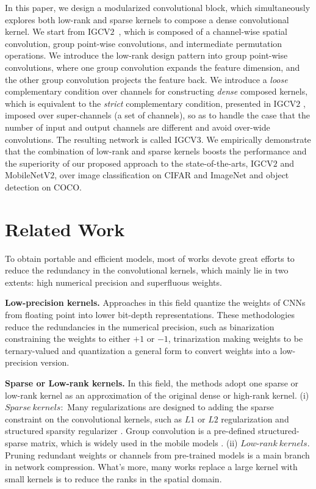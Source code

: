 \documentclass{bmvc2k}
\begin{document}
	In this paper,
	we design a modularized convolutional block,
	which simultaneously explores both low-rank and sparse kernels
	to compose a dense convolutional kernel.
	We start from IGCV$2$~\cite{ISSC18},
	which is composed of a channel-wise spatial convolution,
	group point-wise convolutions,
	and intermediate permutation operations.
	We introduce the low-rank design pattern
	into group point-wise convolutions,
	where one group convolution expands the feature dimension,
	and the other group convolution projects the feature back.
	We introduce a \emph{loose} complementary condition over channels for constructing \emph{dense} composed kernels,
	which is equivalent to the \emph{strict} complementary condition, presented in IGCV$2$ \cite{ISSC18},
	imposed over super-channels (a set of channels),
	so as to handle the case
	that the number of input and output channels are different
	and avoid over-wide convolutions.
	The resulting network is called IGCV$3$.
	We empirically demonstrate that the combination of low-rank and sparse kernels boosts the performance
	and the superiority of our proposed approach
	to the state-of-the-arts, IGCV$2$ and MobileNetV$2$,
	over image classification on CIFAR and ImageNet
	and object detection on COCO.

	\section{Related Work}

	To obtain portable and efficient models, most of works devote great efforts to reduce the redundancy in the convolutional kernels, which mainly lie in two extents: high numerical precision and superfluous weights.


	\noindent\textbf{Low-precision kernels.}
	Approaches in this field quantize the weights of CNNs from floating point into lower bit-depth representations. These methodologies reduce the redundancies in the numerical precision, such as binarization \cite{courbariaux2016binarized} constraining the weights to either $+1$ or $-1$, trinarization \cite{li2016ternary,zhou2016dorefa,zhu2016trained} making weights to be ternary-valued and quantization \cite{HanMD15,zhou2017incremental} a general form to convert weights into a low-precision version.

	\noindent\textbf{Sparse or Low-rank kernels.} In this field, the methods adopt one sparse or low-rank kernel as an approximation of the original dense or high-rank kernel.
	(i) $Sparse\ kernels:$ Many regularizations are designed to adding the sparse constraint on the convolutional kernels, such as $L1$ or $L2$ regularization \cite{HanMD15,HanPTD15} and structured sparsity regularizer \cite{LiKDSG16,WenWWCL16,alvarez2016learning}. Group convolution is a pre-defined structured-sparse matrix, which is widely used in the mobile models \cite{XieGDTH16,ZhaoWLTZ16}. (ii) $Low$-$rank\ kernels.$ Pruning redundant weights or channels from pre-trained models \cite{park2016faster,LiKDSG16,he2017channel,LuoWL17} is a main branch in network compression. What's more, many works \cite{SimonyanZ14a,SzegedyVISW16,denton2014exploiting} replace a large kernel with small kernels is to reduce the ranks in the spatial domain.
\end{document}
